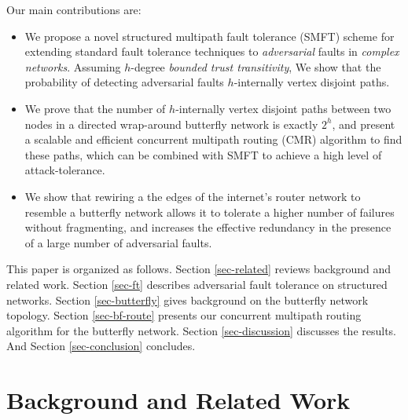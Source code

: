 \documentclass[10pt,letterpaper]{article}
\providecommand{\DIFaddbegin}{} %
\providecommand{\DIFaddend}{} %
\providecommand{\DIFdelbegin}{} %
\providecommand{\DIFdelend}{} %
\begin{document}
Our main contributions are:
 \begin{itemize} 
\item{
We propose a novel structured multipath fault tolerance (SMFT) scheme
for extending standard fault tolerance techniques to
{\em adversarial} faults in {\em complex networks}.
Assuming $h$-degree {\em bounded trust transitivity},
We show that the probability of detecting adversarial faults
$h$-internally vertex disjoint paths.
}
\DIFdelbegin %
\DIFdelend \DIFaddbegin \item{We prove that the number of $h$-internally vertex disjoint
paths between two nodes in a directed wrap-around butterfly network
is exactly $2^h$,
and present a scalable and efficient concurrent multipath routing (CMR) algorithm
to find these paths,
which can be combined with SMFT to achieve a high level of attack-tolerance.
}
\DIFaddend \item{We show that rewiring a the edges of the internet's router network to
resemble a butterfly network allows it to tolerate a higher number of failures
without fragmenting, and increases the effective redundancy in the presence
of a large number of adversarial faults.}
 \end{itemize} 

This paper is organized as follows.
Section \ref{sec-related} reviews background and related work.
Section \ref{sec-ft} describes adversarial fault tolerance on
structured networks.
Section \ref{sec-butterfly} gives background on the butterfly network topology.
Section \ref{sec-bf-route} presents our concurrent multipath routing
algorithm for the butterfly network.
Section \ref{sec-discussion} discusses the results.
And Section \ref{sec-conclusion} concludes.

\section*{Background and Related Work}
\label{sec-related}
\end{document}
